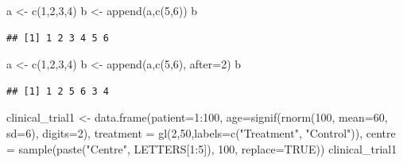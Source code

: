 \documentclass[]{article}
\newenvironment{Shaded}{\begin{snugshade}}{\end{snugshade}}
\newcommand{\AttributeTok}[1]{\textcolor[rgb]{0.77,0.63,0.00}{#1}}
\newcommand{\ConstantTok}[1]{\textcolor[rgb]{0.00,0.00,0.00}{#1}}
\newcommand{\DecValTok}[1]{\textcolor[rgb]{0.00,0.00,0.81}{#1}}
\newcommand{\FunctionTok}[1]{\textcolor[rgb]{0.00,0.00,0.00}{#1}}
\newcommand{\NormalTok}[1]{#1}
\newcommand{\OtherTok}[1]{\textcolor[rgb]{0.56,0.35,0.01}{#1}}
\newcommand{\SpecialCharTok}[1]{\textcolor[rgb]{0.00,0.00,0.00}{#1}}
\newcommand{\StringTok}[1]{\textcolor[rgb]{0.31,0.60,0.02}{#1}}
\begin{document}
\begin{Shaded}
\begin{Highlighting}[]
\NormalTok{a }\OtherTok{\textless{}{-}} \FunctionTok{c}\NormalTok{(}\DecValTok{1}\NormalTok{,}\DecValTok{2}\NormalTok{,}\DecValTok{3}\NormalTok{,}\DecValTok{4}\NormalTok{)}
\NormalTok{b }\OtherTok{\textless{}{-}} \FunctionTok{append}\NormalTok{(a,}\FunctionTok{c}\NormalTok{(}\DecValTok{5}\NormalTok{,}\DecValTok{6}\NormalTok{))}
\NormalTok{b}
\end{Highlighting}
\end{Shaded}

\begin{verbatim}
## [1] 1 2 3 4 5 6
\end{verbatim}

\begin{Shaded}
\begin{Highlighting}[]
\NormalTok{a }\OtherTok{\textless{}{-}} \FunctionTok{c}\NormalTok{(}\DecValTok{1}\NormalTok{,}\DecValTok{2}\NormalTok{,}\DecValTok{3}\NormalTok{,}\DecValTok{4}\NormalTok{)}
\NormalTok{b }\OtherTok{\textless{}{-}} \FunctionTok{append}\NormalTok{(a,}\FunctionTok{c}\NormalTok{(}\DecValTok{5}\NormalTok{,}\DecValTok{6}\NormalTok{), }\AttributeTok{after=}\DecValTok{2}\NormalTok{)}
\NormalTok{b}
\end{Highlighting}
\end{Shaded}

\begin{verbatim}
## [1] 1 2 5 6 3 4
\end{verbatim}

\begin{Shaded}
\begin{Highlighting}[]
\NormalTok{clinical\_trial1 }\OtherTok{\textless{}{-}} \FunctionTok{data.frame}\NormalTok{(}\AttributeTok{patient=}\DecValTok{1}\SpecialCharTok{:}\DecValTok{100}\NormalTok{,}
                              \AttributeTok{age=}\FunctionTok{signif}\NormalTok{(}\FunctionTok{rnorm}\NormalTok{(}\DecValTok{100}\NormalTok{, }\AttributeTok{mean=}\DecValTok{60}\NormalTok{, }\AttributeTok{sd=}\DecValTok{6}\NormalTok{),}
                                         \AttributeTok{digits=}\DecValTok{2}\NormalTok{),}
                              \AttributeTok{treatment =} \FunctionTok{gl}\NormalTok{(}\DecValTok{2}\NormalTok{,}\DecValTok{50}\NormalTok{,}\AttributeTok{labels=}\FunctionTok{c}\NormalTok{(}\StringTok{"Treatment"}\NormalTok{, }\StringTok{"Control"}\NormalTok{)),}
                              \AttributeTok{centre =} \FunctionTok{sample}\NormalTok{(}\FunctionTok{paste}\NormalTok{(}\StringTok{"Centre"}\NormalTok{, LETTERS[}\DecValTok{1}\SpecialCharTok{:}\DecValTok{5}\NormalTok{]),}
                                                          \DecValTok{100}\NormalTok{, }\AttributeTok{replace=}\ConstantTok{TRUE}\NormalTok{))}
\NormalTok{clinical\_trial1}
\end{Highlighting}
\end{Shaded}
\end{document}
